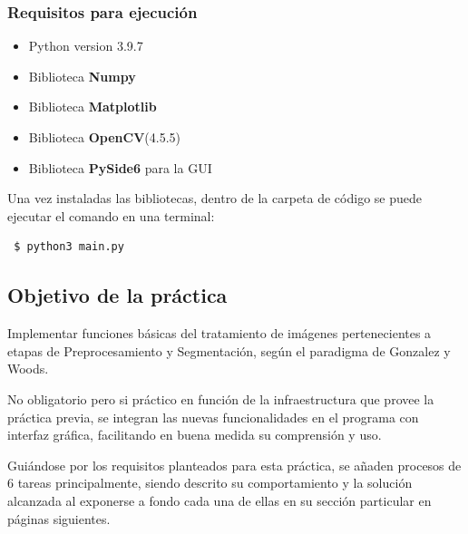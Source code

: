	\subsubsection*{Requisitos para ejecución}
		\begin{itemize}
			\item Python version 3.9.7
			\item Biblioteca \textbf{Numpy}
			\item Biblioteca \textbf{Matplotlib}
			\item Biblioteca \textbf{OpenCV}(4.5.5)
			\item Biblioteca \textbf{PySide6} para la GUI
		\end{itemize}
	
		Una vez instaladas las bibliotecas, dentro de la carpeta de código se puede ejecutar el comando en una terminal:
		
		\begin{verbatim}
 $ python3 main.py
		\end{verbatim}

\subsection*{Objetivo de la práctica}
	\hfill\break
	\justifying
	Implementar funciones básicas del tratamiento de imágenes pertenecientes a etapas de Preprocesamiento y Segmentación, según el paradigma de Gonzalez y Woods.
	
	\hfill\break
	\justifying
	No obligatorio pero si práctico en función de la infraestructura que provee la práctica previa, se integran las nuevas funcionalidades en el programa con interfaz gráfica, facilitando en buena medida su comprensión y uso.
	
	\hfill\break
	\justifying
	Guiándose por los requisitos planteados para esta práctica, se añaden procesos de 6 tareas principalmente, siendo descrito su comportamiento y la solución alcanzada al exponerse a fondo cada una de ellas en su sección particular en páginas siguientes.
	
